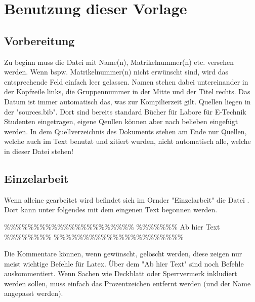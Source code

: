 	
	\newpage
	\section{Benutzung dieser Vorlage}
	\subsection{Vorbereitung}
	Zu beginn muss die Datei  mit Name(n), Matrikelnummer(n) etc. versehen werden. Wenn bspw. Matrikelnummer(n) nicht erwünscht sind, wird das entsprechende Feld einfach leer gelassen.\newline
	Namen stehen dabei untereinander in der Kopfzeile links, die Gruppennummer in der Mitte und der Titel rechts.
	Das Datum ist immer automatisch das, was zur Kompilierzeit gilt.\newline
	Quellen liegen in der "sources.bib". Dort sind bereits standard Bücher für Labore für E-Technik Studenten eingetragen, eigene Qeullen können aber nach belieben eingefügt werden. In dem Quellverzeichnis des Dokuments stehen am Ende nur Quellen, welche auch im Text benutzt und zitiert wurden, nicht automatisch alle, welche in dieser Datei stehen!
	\subsection{Einzelarbeit}
	Wenn alleine gearbeitet wird befindet sich im Ornder "Einzelarbeit" die Datei . Dort kann unter folgendes mit dem eingenen Text begonnen werden.\newline\newline
	
	\%\%\%\%\%\%\%\%\%\%\%\%\%\%\%\%\%\%\%\%\%\%\newline
	\%\%\%\%\%\%\% Ab hier Text \%\%\%\%\%\%\%\%\newline
	\%\%\%\%\%\%\%\%\%\%\%\%\%\%\%\%\%\%\%\%\%\%\newline\newline
	
	Die Kommentare können, wenn gewünscht, gelöscht werden, diese zeigen nur meist wichtige Befehle für Latex.\newline
	Über dem "Ab hier Text" sind noch Befehle auskommentiert. Wenn Sachen wie Deckblatt oder Sperrvermerk inkludiert werden sollen, muss einfach das Prozentzeichen entfernt werden (und der Name angepasst werden).
	
